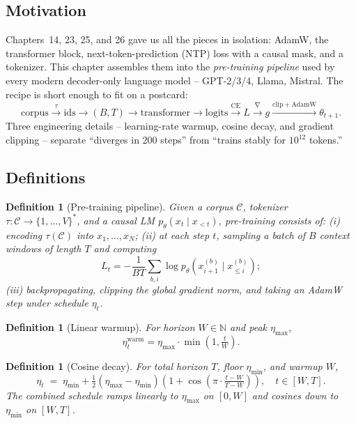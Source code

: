 \documentclass[11pt]{article}
\newtheorem{definition}[theorem]{Definition}
\theoremstyle{remark}
\begin{document}
\subsection*{Motivation}

Chapters~14, 23, 25, and 26 gave us all the pieces in isolation: AdamW, the transformer block, next-token-prediction (NTP) loss with a causal mask, and a tokenizer. This chapter assembles them into the \emph{pre-training pipeline} used by every modern decoder-only language model -- GPT-2/3/4, Llama, Mistral. The recipe is short enough to fit on a postcard:
\[
\text{corpus} \xrightarrow{\tau} \text{ids} \to (B,T) \to \text{transformer} \to \text{logits} \xrightarrow{\mathrm{CE}} L \xrightarrow{\nabla} g \xrightarrow{\text{clip}+\mathrm{AdamW}} \theta_{t+1}.
\]
Three engineering details -- learning-rate warmup, cosine decay, and gradient clipping -- separate ``diverges in 200 steps'' from ``trains stably for $10^{12}$ tokens.''

\subsection*{Definitions}

\begin{definition}[Pre-training pipeline]
Given a corpus $\mathcal{C}$, tokenizer $\tau:\mathcal{C}\to\{1,\dots,V\}^*$, and a causal LM $p_\theta(x_t\mid x_{<t})$, \emph{pre-training} consists of: (i) encoding $\tau(\mathcal{C})$ into $x_1,\dots,x_N$; (ii) at each step $t$, sampling a batch of $B$ context windows of length $T$ and computing
\[
L_t = -\frac{1}{BT}\sum_{b,i}\log p_\theta(x^{(b)}_{i+1}\mid x^{(b)}_{\le i});
\]
(iii) backpropagating, clipping the global gradient norm, and taking an AdamW step under schedule $\eta_t$.
\end{definition}

\begin{definition}[Linear warmup]
For horizon $W\in\mathbb{N}$ and peak $\eta_{\max}$,
\[
\eta_t^{\text{warm}} = \eta_{\max}\cdot\min\!\left(1,\tfrac{t}{W}\right).
\]
\end{definition}

\begin{definition}[Cosine decay]
For total horizon $T$, floor $\eta_{\min}$, and warmup $W$,
\[
\eta_t \;=\; \eta_{\min} + \tfrac{1}{2}(\eta_{\max}-\eta_{\min})\!\left(1 + \cos\!\left(\pi\cdot\tfrac{t-W}{T-W}\right)\right), \quad t\in[W,T].
\]
The combined schedule ramps linearly to $\eta_{\max}$ on $[0,W]$ and cosines down to $\eta_{\min}$ on $[W,T]$.
\end{definition}
\end{document}
